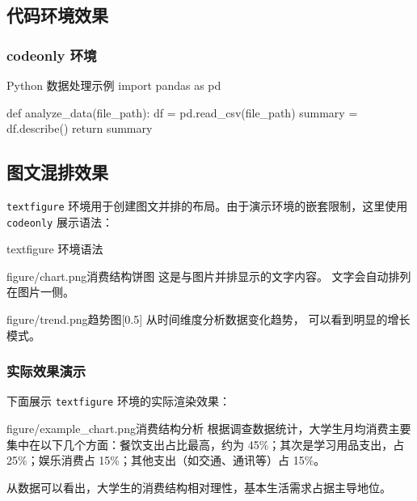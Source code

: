 \documentclass[linux]{hustreport}
\begin{document}
\subsection{代码环境效果}

\subsubsection{codeonly 环境}

\begin{codeonly}{Python 数据处理示例}
import pandas as pd

def analyze_data(file_path):
    df = pd.read_csv(file_path)
    summary = df.describe()
    return summary
\end{codeonly}

\subsection{图文混排效果}

\texttt{textfigure} 环境用于创建图文并排的布局。由于演示环境的嵌套限制，这里使用 \texttt{codeonly} 展示语法：

\begin{codeonly}{textfigure 环境语法}

\begin{textfigure}{figure/chart.png}{消费结构饼图}
    这是与图片并排显示的文字内容。
    文字会自动排列在图片一侧。
\end{textfigure}

\begin{textfigure}[left]{figure/trend.png}{趋势图}[0.5]
    从时间维度分析数据变化趋势，
    可以看到明显的增长模式。
\end{textfigure}
\end{codeonly}

\subsubsection{实际效果演示}

下面展示 \texttt{textfigure} 环境的实际渲染效果：

\begin{textfigure}{figure/example_chart.png}{消费结构分析}
    根据调查数据统计，大学生月均消费主要集中在以下几个方面：餐饮支出占比最高，约为 45\%；其次是学习用品支出，占 25\%；娱乐消费占 15\%；其他支出（如交通、通讯等）占 15\%。
    
    从数据可以看出，大学生的消费结构相对理性，基本生活需求占据主导地位。
\end{textfigure}
\end{document}
